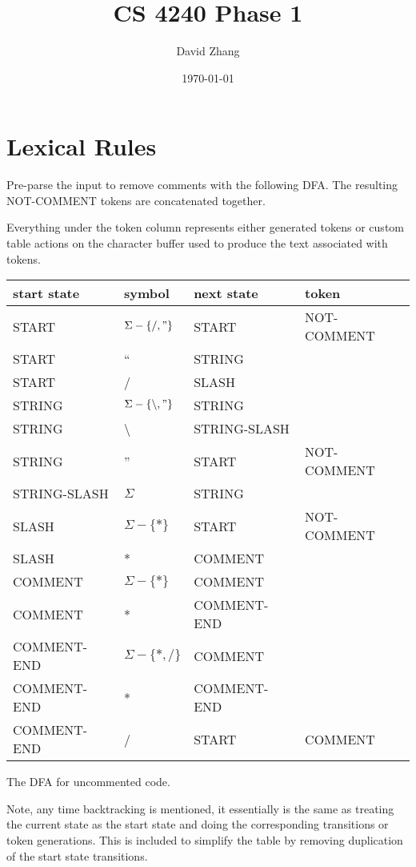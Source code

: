 \documentclass[11pt, fleqn]{article}
\begin{document}
\title{CS 4240 Phase 1}
\author{David Zhang}
\date{\today}

\newtheorem{Lemma}{Lemma}
\newtheorem{Theorem}{Theorem}
\maketitle

\section{Lexical Rules}

Pre-parse the input to remove comments with the following DFA. The resulting NOT-COMMENT tokens are concatenated together.

Everything under the token column represents either generated tokens or custom table actions on the character buffer used to produce the text associated with tokens.

\begin{longtable}{l|l|l|l}
start state		&	symbol							&	next	 state		&	token		 	\\
\hline
START			&	$\Sigma - \{/, "\}$				& 	START			&	NOT-COMMENT		\\
START			&	``								& 	STRING			&					\\
START			&	/								&	SLASH			&					\\
STRING			&	$\Sigma - \{\backslash, "\}$		& 	STRING			&					\\
STRING			&	\textbackslash					& 	STRING-SLASH		&					\\
STRING			&	''								& 	START			&	NOT-COMMENT		\\
STRING-SLASH		&	$\Sigma$							&	STRING			&					\\
SLASH			&	$\Sigma - \{*\}$					&	START			&	NOT-COMMENT		\\
SLASH			&	*								&	COMMENT			&					\\
COMMENT			&	$\Sigma - \{*\}$					&	COMMENT			&					\\
COMMENT			&	*								&	COMMENT-END		&					\\
COMMENT-END		&	$\Sigma - \{*, /\}$				&	COMMENT			&					\\
COMMENT-END		&	*								&	COMMENT-END		&					\\
COMMENT-END		&	/								&	START			&	COMMENT			\\
\end{longtable}

The DFA for uncommented code.

Note, any time backtracking is mentioned, it essentially is the same as treating the current state as the start state and doing the corresponding transitions or token generations. This is included to simplify the table by removing duplication of the start state transitions.
\end{document}
